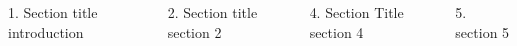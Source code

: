 \documentclass[final,english]{beamer}
\begin{document}
  \linespread{1.2}
  \begin{frame}[plain]{} 
%
      \begin{columns}
    \begin{exampleblock}{ 1. Section title}
introduction
    \end{exampleblock}
             \vfill


        \begin{block}{2. Section title}    
section 2
        \end{block}
             \vfill


             
     
        \begin{block}{ 4. Section Title}    
section 4        
        \end{block}
             \vfill
             
             
        \begin{block}{ 5. }    
         section 5
\end{block}
             \vfill


\end{columns}
\end{frame}
\end{document}
